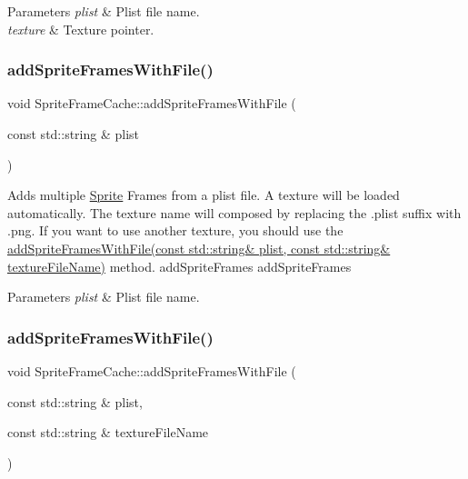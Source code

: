 \begin{DoxyParams}{Parameters}
{\em plist} & Plist file name. \\
\hline
{\em texture} & Texture pointer. \\
\hline
\end{DoxyParams}
\mbox{\label{classSpriteFrameCache_ad99267fc3a1f057d2efcbb43f75a9d2e}} 
\subsubsection{\texorpdfstring{add\+Sprite\+Frames\+With\+File()}{addSpriteFramesWithFile()}\hspace{0.1cm}{\footnotesize\ttfamily [4/6]}}
{\footnotesize\ttfamily void Sprite\+Frame\+Cache\+::add\+Sprite\+Frames\+With\+File (\begin{DoxyParamCaption}\item[{const std\+::string \&}]{plist }\end{DoxyParamCaption})}

Adds multiple \hyperlink{classSprite}{Sprite} Frames from a plist file. A texture will be loaded automatically. The texture name will composed by replacing the .plist suffix with .png. If you want to use another texture, you should use the \hyperlink{classSpriteFrameCache_aec8dc209f1f9f297b319af67f0d8aa0c}{add\+Sprite\+Frames\+With\+File(const std\+::string\& plist, const std\+::string\& texture\+File\+Name)} method.  add\+Sprite\+Frames  add\+Sprite\+Frames


\begin{DoxyParams}{Parameters}
{\em plist} & Plist file name. \\
\hline
\end{DoxyParams}
\mbox{\label{classSpriteFrameCache_aec8dc209f1f9f297b319af67f0d8aa0c}} 
\subsubsection{\texorpdfstring{add\+Sprite\+Frames\+With\+File()}{addSpriteFramesWithFile()}\hspace{0.1cm}{\footnotesize\ttfamily [5/6]}}
{\footnotesize\ttfamily void Sprite\+Frame\+Cache\+::add\+Sprite\+Frames\+With\+File (\begin{DoxyParamCaption}\item[{const std\+::string \&}]{plist,  }\item[{const std\+::string \&}]{texture\+File\+Name }\end{DoxyParamCaption})}

